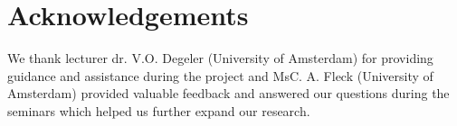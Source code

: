 \section {Acknowledgements}
We thank lecturer dr. V.O. Degeler (University of Amsterdam) for providing guidance and assistance during the project and MsC. A. Fleck (University of Amsterdam) provided valuable feedback and answered our questions during the seminars which helped us further expand our research. 
